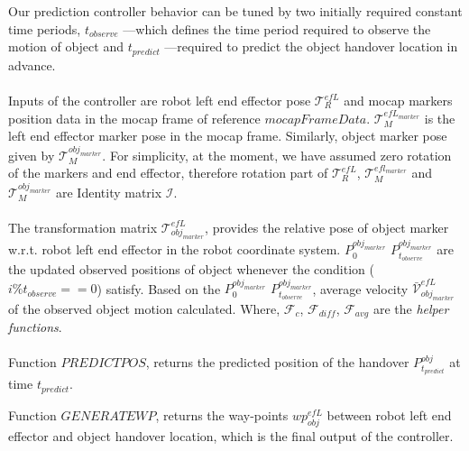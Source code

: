 \documentclass{article}
\begin{document}
\section*{}
Our prediction controller behavior can be tuned by two initially required constant time periods, $t_{observe}$ ---which defines the time period required to observe the motion of object and $t_{predict}$ ---required to predict the object handover location in advance.

\paragraph*{}
Inputs of the controller are robot left end effector pose $\mathcal{T}^{efL}_R$ and mocap markers position data in the mocap frame of reference $mocapFrameData$. $\mathcal{T}^{efL_{marker}}_M$ is the left end effector marker pose in the mocap frame. Similarly, object marker pose given by $\mathcal{T}^{obj_{marker}}_M$. For simplicity, at the moment, we have assumed zero rotation of the markers and end effector, therefore rotation part of $\mathcal{T}^{efL}_R$, $\mathcal{T}^{efl_{marker}}_M$ and $\mathcal{T}^{obj_{marker}}_M$ are Identity matrix $\mathcal{I}$. 

\paragraph*{}
The transformation matrix $\mathcal{T}^{efL}_{obj_{marker}}$, provides the relative pose of object marker w.r.t. robot left end effector in the robot coordinate system. $P^{obj_{marker}}_0$ $P^{obj_{marker}}_{t_{observe}}$ are the updated observed positions of object whenever the condition ($i\%t_{observe}==0$) satisfy. Based on the  $P^{obj_{marker}}_0$ $P^{obj_{marker}}_{t_{observe}}$, average velocity $\mathcal{\bar{V}}^{efL}_{obj_{marker}}$ of the observed object motion calculated. Where, $\mathcal{F}_c$, $\mathcal{F}_{diff}$, $\mathcal{F}_{avg}$ are the \textit{helper functions}.

\paragraph*{}
Function $PREDICTPOS$, returns the predicted position of the handover $P^{obj}_{t_{predict}}$ at time $t_{predict}$.

Function $GENERATEWP$, returns the way-points $wp^{efL}_{obj}$ between robot left end effector and object handover location, which is the final output of the controller. 
\end{document}
